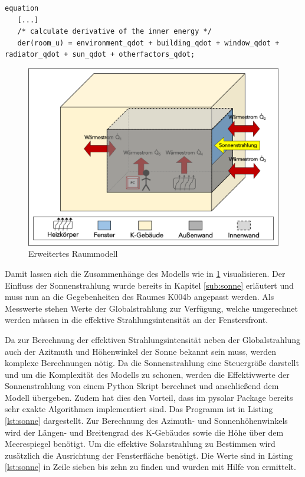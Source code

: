 \begin{lstlisting}[language=Modelica, caption={Erweitertes Gleichungssystem Modell des Raumes unter Berücksichtigung der Sonneneinstrahlung und Störgrößen},label=lst:raumdrei]
equation
   [...]
   /* calculate derivative of the inner energy */
   der(room_u) = environment_qdot + building_qdot + window_qdot + radiator_qdot + sun_qdot + otherfactors_qdot;
\end{lstlisting}

\begin{figure}
\centering
\includegraphics[width=\textwidth]{abbildungen/20160317_raumzwei}
\caption{Erweitertes Raummodell}
\label{fig:raumdrei}
\end{figure}


Damit lassen sich die Zusammenhänge des Modells wie in \ref{fig:raumdrei} visualisieren. Der Einfluss der Sonnenstrahlung wurde bereits in Kapitel \ref{sub:sonne} erläutert und muss nun an die Gegebenheiten des Raumes K004b angepasst werden. Als Messwerte stehen Werte der Globalstrahlung zur Verfügung, welche umgerechnet werden müssen in die effektive Strahlungsintensität an der Fenstersfront.

Da zur Berechnung der effektiven Strahlungsintensität neben der Globalstrahlung auch der Azitmuth und Höhenwinkel der Sonne bekannt sein muss, werden komplexe Berechnungen nötig. Da die Sonnenstrahlung eine Steuergröße darstellt und um die Komplexität des Modells zu schonen, werden die Effektivwerte der Sonnenstrahlung von einem Python Skript berechnet und anschließend dem Modell übergeben. Zudem hat dies den Vorteil, dass im pysolar Package bereits sehr exakte Algorithmen implementiert sind. 
Das Programm ist in Listing \ref{lst:sonne} dargestellt. 
Zur Berechnung des Azimuth- und Sonnenhöhenwinkels wird der Längen- und Breitengrad des K-Gebäudes sowie die Höhe über dem Meerespiegel benötigt. Um die effektive Solarstrahlung zu Bestimmen wird zusätzlich die Ausrichtung der Fensterfläche benötigt. Die Werte sind in Listing \ref{lst:sonne} in Zeile sieben bis zehn zu finden und wurden mit Hilfe von \cite{go15} ermittelt.

